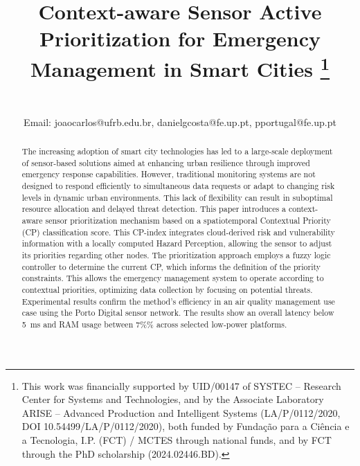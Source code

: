 \documentclass[conference]{IEEEtran}
\begin{document}
\title{Context-aware Sensor Active Prioritization for Emergency Management in Smart Cities
\thanks{This work was financially supported by UID/00147 of SYSTEC – Research Center for Systems and Technologies, and by the Associate Laboratory ARISE – Advanced Production and Intelligent Systems (LA/P/0112/2020, DOI 10.54499/LA/P/0112/2020), both funded by Fundação para a Ciência e a Tecnologia, I.P. (FCT) / MCTES through national funds, and by FCT through the PhD scholarship (2024.02446.BD).}


}

\author{
%
%
%
\\Email: joaocarlos@ufrb.edu.br, danielgcosta@fe.up.pt, pportugal@fe.up.pt
}

\maketitle

\begin{abstract}
The increasing adoption of smart city technologies has led to a large-scale deployment of sensor-based solutions aimed at enhancing urban resilience through improved emergency response capabilities. However, traditional monitoring systems are not designed to respond efficiently to simultaneous data requests or adapt to changing risk levels in dynamic urban environments. This lack of flexibility can result in suboptimal resource allocation and delayed threat detection. This paper introduces a context-aware sensor prioritization mechanism based on a spatiotemporal Contextual Priority (CP) classification score. This CP-index integrates cloud-derived risk and vulnerability information with a locally computed Hazard Perception, allowing the sensor to adjust its priorities regarding other nodes. The prioritization approach employs a fuzzy logic controller to determine the current CP, which informs the definition of the priority constraints. This allows the emergency management system to operate according to contextual priorities, optimizing data collection by focusing on potential threats. Experimental results confirm the method's efficiency in an air quality management use case using the Porto Digital sensor network. The results show an overall latency below 5~ms and RAM usage between 7\%\% across selected low-power platforms.
\end{abstract}
\end{document}
